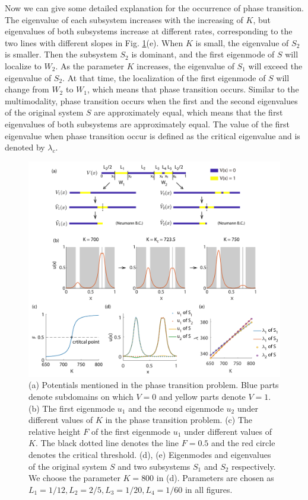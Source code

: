 \documentclass[a4paper,11pt]{article}
\begin{document}
Now we can give some detailed explanation for the occurrence of phase transition. The eigenvalue of each subsystem increases with the increasing of $K$, but eigenvalues of both subsystems increase at different rates, corresponding to the two lines with different slopes in Fig. \ref{fig5}(e). When $K$ is small, the eigenvalue of $S_2$ is smaller. Then the subsystem $S_2$ is dominant, and the first eigenmode of $S$ will localize to $W_2$. As the parameter $K$ increases, the eigenvalue of $S_1$ will exceed the eigenvalue of $S_2$. At that time, the localization of the first eigenmode of $S$ will change from $W_2$ to $W_1$, which means that phase transition occurs. Similar to the multimodality, phase transition occurs when the first and the second eigenvalues of the original system $S$ are approximately equal, which means that the first eigenvalues of both subsystems are approximately equal. The value of the first eigenvalue when phase transition occur is defined as the critical eigenvalue and is denoted by $\lambda_c$.

\begin{figure}
\centering
\includegraphics[width=\linewidth]{Fig5}
\caption{(a) Potentials mentioned in the phase transition problem. Blue parts denote subdomains on which $V = 0$ and yellow parts denote $V = 1$. (b) The first eigenmode $u_1$ and the second eigenmode $u_2$ under different values of $K$ in the phase transition problem. (c) The relative height $F$ of the first eigenmode $u_1$ under different values of $K$. The black dotted line denotes the line $F = 0.5$ and the red circle denotes the critical threshold. (d), (e) Eigenmodes and eigenvalues of the original system $S$ and two subsystems $S_1$ and $S_2$ respectively. We choose the parameter $K = 800$ in (d). Parameters are chosen as $L_1 = 1/12, L_2 = 2/5, L_3= 1/20, L_4 = 1/60$ in all figures.}
\label{fig5}
\end{figure}
\end{document}
